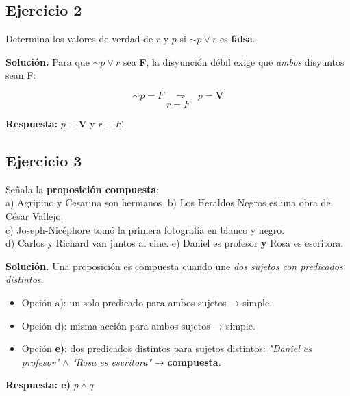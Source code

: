 \documentclass[12pt,a4paper]{article}
\newcommand{\V}{\textbf{V}}
\newcommand{\F}{F}
\newcommand{\resultado}[1]{\textcolor{verde}{\textbf{#1}}}
\begin{document}
\bigskip

\subsection*{Ejercicio 2}

\begin{enunciado}
Determina los valores de verdad de $r$ y $p$ si $\sim p \vee r$ es \textbf{falsa}.
\end{enunciado}

\begin{solucion}
\textbf{Solución.} Para que $\sim p \vee r$ sea \textbf{F}, la disyunción débil exige que \emph{ambos} disyuntos sean F:

\[
\sim p = \F \quad \Rightarrow \quad p = \V
\]
\[
r = \F
\]

\textbf{Respuesta:} $p \equiv \V$ \quad y \quad $r \equiv \F$.
\end{solucion}

\bigskip

\subsection*{Ejercicio 3}

\begin{enunciado}
Señala la \textbf{proposición compuesta}: \\[4pt]
a) Agripino y Cesarina son hermanos.\quad
b) Los Heraldos Negros es una obra de César Vallejo.\\
c) Joseph-Nicéphore tomó la primera fotografía en blanco y negro.\\
d) Carlos y Richard van juntos al cine.\quad
e) Daniel es profesor \textbf{y} Rosa es escritora.
\end{enunciado}

\begin{solucion}
\textbf{Solución.} Una proposición es compuesta cuando une \emph{dos sujetos con predicados distintos}.

\begin{itemize}
  \item Opción a): un solo predicado para ambos sujetos → simple.
  \item Opción d): misma acción para ambos sujetos → simple.
  \item Opción \resultado{e)}: dos predicados distintos para sujetos distintos:
        \textit{"Daniel es profesor"} $\wedge$ \textit{"Rosa es escritora"} → \textbf{compuesta}.
\end{itemize}

\textbf{Respuesta: e)} \quad $p \wedge q$
\end{solucion}
\end{document}
